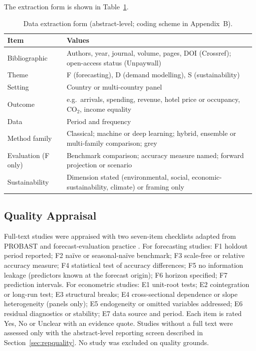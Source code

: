 \documentclass[11pt,a4paper]{article}
\begin{document}
The extraction form is shown in Table~\ref{tab:extraction}.

\begin{table}[t]\centering\small
\caption{Data extraction form (abstract-level; coding scheme in Appendix~B).}\label{tab:extraction}
\begin{tabularx}{\linewidth}{@{}p{3.6cm}X@{}}
\toprule
Item & Values\\
\midrule
Bibliographic & Authors, year, journal, volume, pages, DOI (Crossref); open-access status (Unpaywall)\\
Theme & F (forecasting), D (demand modelling), S (sustainability)\\
Setting & Country or multi-country panel\\
Outcome & e.g.\ arrivals, spending, revenue, hotel price or occupancy, CO$_2$, income equality\\
Data & Period and frequency\\
Method family & Classical; machine or deep learning; hybrid, ensemble or multi-family comparison; grey\\
Evaluation (F only) & Benchmark comparison; accuracy measure named; forward projection or scenario\\
Sustainability & Dimension stated (environmental, social, economic-sustainability, climate) or framing only\\
\bottomrule
\end{tabularx}
\end{table}

\subsection{Quality Appraisal}\label{sec:quality}
Full-text studies were appraised with two seven-item checklists adapted from PROBAST \citep{Wolff2019} and forecast-evaluation practice \citep{Hyndman2021fpp,Diebold1995}. For forecasting studies: F1 holdout period reported; F2 na\"ive or seasonal-na\"ive benchmark; F3 scale-free or relative accuracy measure; F4 statistical test of accuracy differences; F5 no information leakage (predictors known at the forecast origin); F6 horizon specified; F7 prediction intervals. For econometric studies: E1 unit-root tests; E2 cointegration or long-run test; E3 structural breaks; E4 cross-sectional dependence or slope heterogeneity (panels only); E5 endogeneity or omitted variables addressed; E6 residual diagnostics or stability; E7 data source and period. Each item is rated Yes, No or Unclear with an evidence quote. Studies without a full text were assessed only with the abstract-level reporting screen described in Section~\ref{sec:repquality}. No study was excluded on quality grounds.
\end{document}
